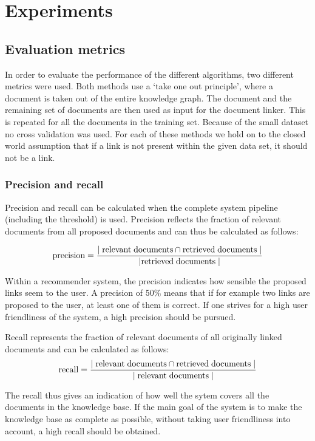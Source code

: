 \section{Experiments}
\label{sec:experiments}
\subsection{Evaluation metrics}
In order to evaluate the performance of the different algorithms, two different metrics were used. Both methods use a `take one out principle', where a document is taken out of the entire knowledge graph. The document and the remaining set of documents are then used as input for the document linker. This is repeated for all the documents in the training set. Because of the small dataset no cross validation was used. For each of these methods we hold on to the closed world assumption that if a link is not present within the given data set, it should not be a link. 

\subsubsection{Precision and recall} 
Precision and recall can be calculated when the complete system pipeline (including the threshold) is used. Precision reflects the fraction of relevant documents from all proposed documents and can thus be calculated as follows:

\begin{align*}
  \textrm{precision} = \frac{|\;\textrm{relevant\;documents} \cap \textrm{retrieved\;documents}\;|}{|\textrm{retrieved\;documents}\;|}
\end{align*}

Within a recommender system, the precision indicates how sensible the proposed links seem to the user. A precision of 50\% means that if for example two links are proposed to the user, at least one of them is correct. If one strives for a high user friendliness of the system, a high precision should be pursued. 

Recall represents the fraction of relevant documents of all originally linked documents and can be calculated as follows:
\begin{align}
  \nonumber \textrm{recall} = \frac{|\;\textrm{relevant\;documents} \cap \textrm{retrieved\;documents}\;|}{|\;\textrm{relevant\;documents}\;|}
\end{align}

The recall thus gives an indication of how well the sytem covers all the documents in the knowledge base. If the main goal of the system is to make the knowledge base as complete as possible, without taking user friendliness into account, a high recall should be obtained. 

